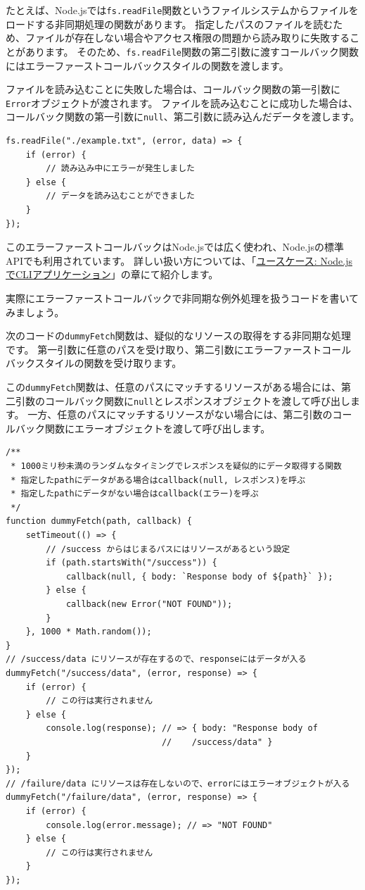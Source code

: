 たとえば、Node.jsでは\texttt{fs.readFile}関数というファイルシステムからファイルをロードする非同期処理の関数があります。
指定したパスのファイルを読むため、ファイルが存在しない場合やアクセス権限の問題から読み取りに失敗することがあります。
そのため、\texttt{fs.readFile}関数の第二引数に渡すコールバック関数にはエラーファーストコールバックスタイルの関数を渡します。

ファイルを読み込むことに失敗した場合は、コールバック関数の第一引数に\texttt{Error}オブジェクトが渡されます。
ファイルを読み込むことに成功した場合は、コールバック関数の第一引数に\texttt{null}、第二引数に読み込んだデータを渡します。
\vspace{-1mm}
\begin{lstlisting}
fs.readFile("./example.txt", (error, data) => {
    if (error) {
        // 読み込み中にエラーが発生しました
    } else {
        // データを読み込むことができました
    }
});
\end{lstlisting}
\vspace{-1mm}
このエラーファーストコールバックはNode.jsでは広く使われ、Node.jsの標準APIでも利用されています。
詳しい扱い方については、「\hyperlink{node-cli}{ユースケース: Node.jsでCLIアプリケーション}」の章にて紹介します。

実際にエラーファーストコールバックで非同期な例外処理を扱うコードを書いてみましょう。

\enlargethispage{\baselineskip}次のコードの\texttt{dummyFetch}関数は、疑似的なリソースの取得をする非同期な処理です。
第一引数に任意のパスを受け取り、第二引数にエラーファーストコールバックスタイルの関数を受け取ります。

この\texttt{dummyFetch}関数は、任意のパスにマッチするリソースがある場合には、第二引数のコールバック関数に\texttt{null}とレスポンスオブジェクトを渡して呼び出します。
一方、任意のパスにマッチするリソースがない場合には、第二引数のコールバック関数にエラーオブジェクトを渡して呼び出します。

\begin{lstlisting}
/**
 * 1000ミリ秒未満のランダムなタイミングでレスポンスを疑似的にデータ取得する関数
 * 指定したpathにデータがある場合はcallback(null, レスポンス)を呼ぶ
 * 指定したpathにデータがない場合はcallback(エラー)を呼ぶ
 */
function dummyFetch(path, callback) {
    setTimeout(() => {
        // /success からはじまるパスにはリソースがあるという設定
        if (path.startsWith("/success")) {
            callback(null, { body: `Response body of ${path}` });
        } else {
            callback(new Error("NOT FOUND"));
        }
    }, 1000 * Math.random());
}
// /success/data にリソースが存在するので、responseにはデータが入る
dummyFetch("/success/data", (error, response) => {
    if (error) {
        // この行は実行されません
    } else {
        console.log(response); // => { body: "Response body of 
                               //    /success/data" }
    }
});
// /failure/data にリソースは存在しないので、errorにはエラーオブジェクトが入る
dummyFetch("/failure/data", (error, response) => {
    if (error) {
        console.log(error.message); // => "NOT FOUND"
    } else {
        // この行は実行されません
    }
});
\end{lstlisting}

